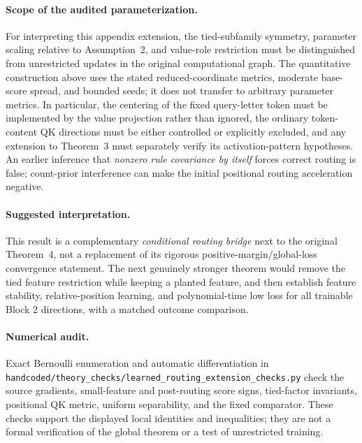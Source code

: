\paragraph{Scope of the audited parameterization.}
For interpreting this appendix extension, the tied-subfamily
symmetry, parameter scaling relative to Assumption~2, and value-role restriction must be distinguished
from unrestricted updates in the original computational graph. The quantitative construction above
uses the stated reduced-coordinate metrics, moderate base-score spread,
and bounded seeds; it does not transfer to arbitrary parameter metrics.  In particular, the
centering of the fixed query-letter token must be implemented by the
value projection rather than ignored, the ordinary token-content QK
directions must be either controlled or explicitly excluded, and any
extension to Theorem~3 must separately verify its activation-pattern
hypotheses.  An earlier inference that \emph{nonzero rule covariance by
itself} forces correct routing is false; count-prior interference can
make the initial positional routing acceleration negative.

\paragraph{Suggested interpretation.}
This result is a complementary \emph{conditional routing bridge} next
to the original Theorem~4, not a replacement of its rigorous
positive-margin/global-loss convergence statement.  The next genuinely
stronger theorem would remove the tied feature restriction while
keeping a planted feature, and then establish feature stability,
relative-position learning, and polynomial-time low loss for all
trainable Block 2 directions, with a matched outcome comparison.

\paragraph{Numerical audit.} Exact Bernoulli enumeration and automatic differentiation in
\nolinkurl{handcoded/theory_checks/learned_routing_extension_checks.py}
check the source gradients, small-feature and post-routing score signs, tied-factor
invariants, positional QK metric, uniform separability, and the fixed comparator.
These checks support the displayed local identities and inequalities; they are
not a formal verification of the global theorem or a test of unrestricted training.
